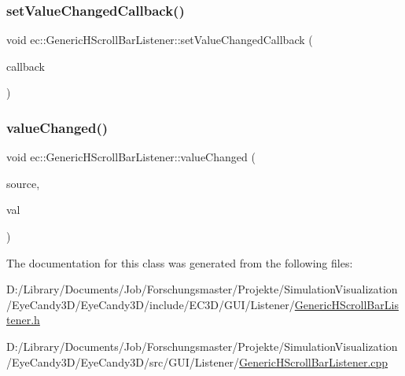 \subsubsection{\texorpdfstring{set\+Value\+Changed\+Callback()}{setValueChangedCallback()}}
{\footnotesize\ttfamily void ec\+::\+Generic\+H\+Scroll\+Bar\+Listener\+::set\+Value\+Changed\+Callback (\begin{DoxyParamCaption}\item[{const \mbox{\hyperlink{classec_1_1_generic_h_scroll_bar_listener_ad02a375c4835a99a41bcd97b6a408637}{Value\+Changed\+\_\+\+Callback}} \&}]{callback }\end{DoxyParamCaption})}

\mbox{\label{classec_1_1_generic_h_scroll_bar_listener_a7c55d42a9623801361988a153d5d2d6d}} 
\subsubsection{\texorpdfstring{value\+Changed()}{valueChanged()}}
{\footnotesize\ttfamily void ec\+::\+Generic\+H\+Scroll\+Bar\+Listener\+::value\+Changed (\begin{DoxyParamCaption}\item[{agui\+::\+H\+Scroll\+Bar $\ast$}]{source,  }\item[{int}]{val }\end{DoxyParamCaption})\hspace{0.3cm}{\ttfamily [override]}}



The documentation for this class was generated from the following files\+:\begin{DoxyCompactItemize}
\item 
D\+:/\+Library/\+Documents/\+Job/\+Forschungsmaster/\+Projekte/\+Simulation\+Visualization/\+Eye\+Candy3\+D/\+Eye\+Candy3\+D/include/\+E\+C3\+D/\+G\+U\+I/\+Listener/\mbox{\hyperlink{_generic_h_scroll_bar_listener_8h}{Generic\+H\+Scroll\+Bar\+Listener.\+h}}\item 
D\+:/\+Library/\+Documents/\+Job/\+Forschungsmaster/\+Projekte/\+Simulation\+Visualization/\+Eye\+Candy3\+D/\+Eye\+Candy3\+D/src/\+G\+U\+I/\+Listener/\mbox{\hyperlink{_generic_h_scroll_bar_listener_8cpp}{Generic\+H\+Scroll\+Bar\+Listener.\+cpp}}\end{DoxyCompactItemize}
